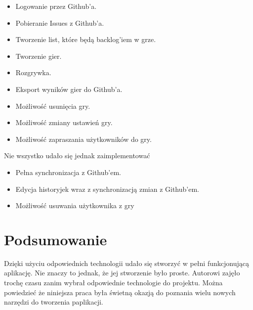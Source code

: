  \begin{itemize}
	\item Logowanie przez Github'a.
	\item Pobieranie Issues z Github'a.
	\item Tworzenie list, które będą backlog'iem w grze.
	\item Tworzenie gier.
	\item Rozgrywka.
	\item Eksport wyników gier do Github'a.
	\item Możliwość usunięcia gry.
	\item Możliwość zmiany ustawień gry.
	\item Możliwość zapraszania użytkowników do gry.
\end{itemize}

Nie wszystko udało się jednak zaimplementować

\begin{itemize}
	\item Pełna synchronizacja z Github'em.
	\item Edycja historyjek wraz z synchronizacją zmian z Github'em.
	\item Możliwość usuwania użytkownika z gry
\end{itemize}

\section{Podsumowanie}

Dzięki użyciu odpowiednich technologii udało się stworzyć w pełni funkcjonującą aplikację.
Nie znaczy to jednak, że jej stworzenie było proste.
Autorowi zajęło trochę czasu zanim wybrał odpowiednie technologie do projektu.
Można powiedzieć że niniejsza praca była świetną okazją do poznania wielu nowych narzędzi do tworzenia paplikacji.